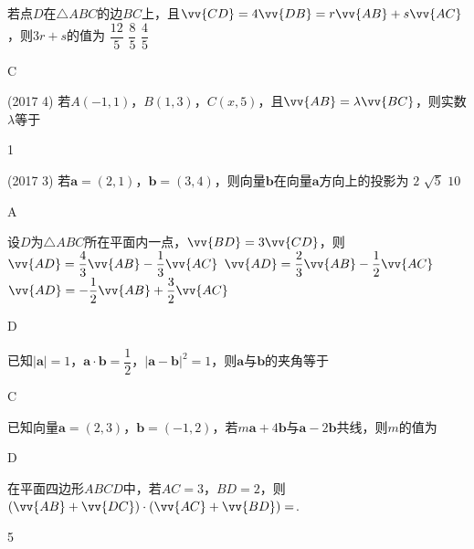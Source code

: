 \begin{exercise}
  \item%
    若点$D$在$\triangle{ABC}$的边$BC$上，且$\vv{CD}=4\vv{DB}=r\vv{AB}+s\vv{AC}$，则$3r+s$的值为\xz
     {$\dfrac{12}5$}
     {$\dfrac{8}5$}
     {$\dfrac{4}5$}
    \begin{answer}
      C
    \end{answer}
  \item%
    (2017  4)
    若$A(-1,1)$，$B(1,3)$，$C(x,5)$，且$\vv{AB}=\lambda\vv{BC}$，则实数$\lambda$等于\xz
    \begin{answer}
      1
    \end{answer}
  \item%
    (2017  3)
    若$\bm a=(2,1)$，$\bm b=(3,4)$，则向量$\bm b$在向量$\bm a$方向上的投影为\xz
     {$2$}
     {$\sqrt5$}
     {$10$}
    \begin{answer}
      A
    \end{answer}
  \item%
    设$D$为$\triangle{ABC}$所在平面内一点，$\vv{BD}=3\vv{CD}$，则\xz
     {$\vv{AD}=\dfrac43\vv{AB}-\dfrac13\vv{AC}$}
     {$\vv{AD}=\dfrac23\vv{AB}-\dfrac12\vv{AC}$}
     {$\vv{AD}=-\dfrac12\vv{AB}+\dfrac32\vv{AC}$}
    \begin{answer}
      D
    \end{answer}
  \item%
    已知$|\bm a|=1$，$\bm a\cdot\bm b=\dfrac12$，$|\bm a-\bm b|^2=1$，则$\bm a$与$\bm b$的夹角等于\xz
    \xx{30\degree}{45\degree}{60\degree}{120\degree}
    \begin{answer}
      C
    \end{answer}
  \item%
    已知向量$\bm a=(2,3)$，$\bm b=(-1,2)$，若$m\bm a+4\bm b$与$\bm a-2\bm b$共线，则$m$的值为\xz
    \begin{answer}
      D
    \end{answer}
  \item%
    在平面四边形$ABCD$中，若$AC=3$，$BD=2$，则$(\vv{AB}+\vv{DC})\cdot(\vv{AC}+\vv{BD})=$\tk.
    \begin{answer}
      5

\end{answer}
\end{exercise}
